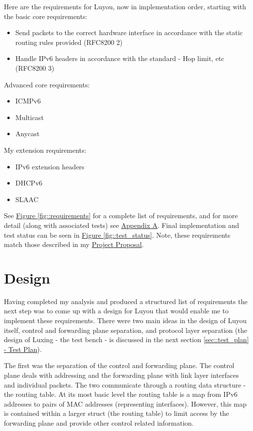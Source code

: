 \documentclass[12pt,a4paper,twoside,openany]{report}
\begin{document}
Here are the requirements for Luyou, now in implementation order, starting with the basic core requirements:
\begin{itemize}
\item Send packets to the correct hardware interface in accordance with the static routing rules provided (RFC8200 2\cite{ipv6_rfc})
\item Handle IPv6 headers in accordance with the standard - Hop limit, etc (RFC8200 3\cite{ipv6_rfc})
\end{itemize}
Advanced core requirements:
\begin{itemize}
\item ICMPv6\cite{icmpv6_rfc}
\item Multicast\cite{ipv6_rfc_adr}
\item Anycast\cite{ipv6_rfc_adr}
\end{itemize}
My extension requirements:
\begin{itemize}
\item IPv6 extension headers\cite{ipv6_rfc}
\item DHCPv6\cite{dhcpv6_rfc}
\item SLAAC\cite{slaac_rfc}
\end{itemize}
See \hyperref[fig::requirements]{Figure }\ref{fig::requirements} for a complete list of requirements, and for more detail (along with associated tests) see \hyperref[appendix::requirements]{Appendix A}. Final implementation and test status can be seen in  \hyperref[fig::test_status]{Figure }\ref{fig::test_status}. Note, these requirements match those described in my  \hyperref[appendix::proposal]{Project Proposal}.

\section{Design}
\label{sec::design}

Having completed my analysis and produced a structured list of requirements the next step was to come up with a design for Luyou that would enable me to implement these requirements.  There were two main ideas in the design of Luyou itself, control and forwarding plane separation, and protocol layer separation (the design of Luxing - the test bench - is discussed in the next section \ref{sec::test_plan}\hyperref[sec::test_plan]{ - Test Plan}). 

\bigskip

The first was the separation of the control and forwarding plane. The control plane deals with addressing and the forwarding plane with link layer interfaces and individual packets.  The two communicate through a routing data structure - the routing table.  At its most basic level the routing table is a map from IPv6 addresses to pairs of MAC addresses (representing interfaces). However, this map is contained within a larger struct (the routing table) to limit access by the forwarding plane and provide other control related information.
\end{document}
